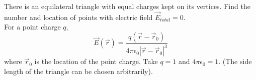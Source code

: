 \begin{problem}
    There is an equilateral triangle with equal charges kept on its vertices. Find the number and location of points with electric field \( \vec{E}_{total}=0 \). \\ For a point charge \( q \),
    \[
        \vec{E}\left(\vec{r}\right)=\frac{q\left(\vec{r}-\vec{r}_0\right)}{4\pi\epsilon_0 |\vec{r}-\vec{r}_0|^3}
    \]
    where \( \vec{r}_0 \) is the location of the point charge. Take \( q=1 \) and \( 4\pi\epsilon_0=1 \). (The side length of the triangle can be chosen arbitrarily).
\end{problem}
